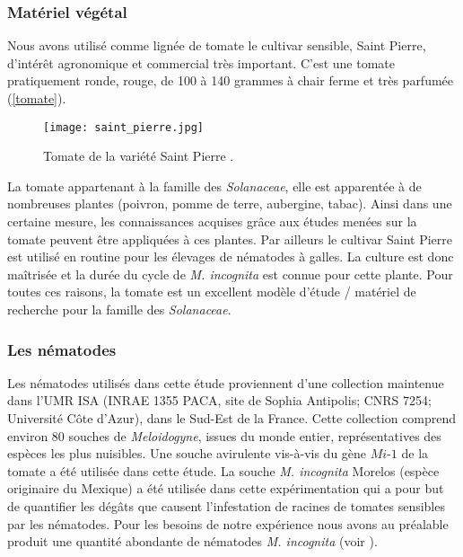 	
\subsubsection{Matériel végétal}
	
	Nous avons utilisé comme lignée de tomate le cultivar  sensible, Saint Pierre, d'intérêt agronomique et commercial très important.
C'est une tomate pratiquement ronde, rouge, de 100 à 140 grammes à chair ferme et très parfumée 
(\autoref{tomate}).

		\begin{figure}[H]
			\centering \texttt{[image: saint\_pierre.jpg]}
			\caption{ Tomate de la variété Saint Pierre \protect\footnotemark.}
	        \label{tomate}
		\end{figure}
			  
La tomate appartenant à la famille des \textit{Solanaceae},
elle est apparentée à de nombreuses plantes  (poivron, pomme de terre, aubergine, tabac).
Ainsi dans une certaine mesure, les connaissances acquises grâce aux études menées sur la tomate peuvent être  appliquées à ces plantes.  Par ailleurs le cultivar Saint Pierre est utilisé en routine pour les élevages de nématodes à galles. La culture est donc maîtrisée et la durée du cycle de \textit{M. incognita} est connue pour cette plante.
Pour toutes ces raisons, la tomate est un excellent  modèle d'étude / matériel de recherche  pour la famille des \textit{Solanaceae}.
	
\subsubsection{Les nématodes}
	Les nématodes  utilisés dans cette étude proviennent d’une collection maintenue
	dans l'UMR ISA  (INRAE 1355 PACA, site de Sophia Antipolis; CNRS 7254; Université Côte d'Azur), dans le Sud-Est de la France. Cette
collection comprend environ 80 souches de \textit{Meloidogyne}, issues du monde entier,
représentatives des espèces les plus nuisibles. Une  souche
avirulente vis-à-vis du gène $Mi$-$1$ de la tomate a été utilisée dans cette étude. La souche \textit{M. incognita} Morelos  (espèce originaire du Mexique) a
été utilisée dans cette expérimentation  qui a pour but  de quantifier les dégâts que causent l'infestation de racines de tomates sensibles  par les nématodes.   
Pour les besoins de notre expérience nous avons au préalable produit une quantité abondante de nématodes \textit{M. incognita} (voir ). 
	
